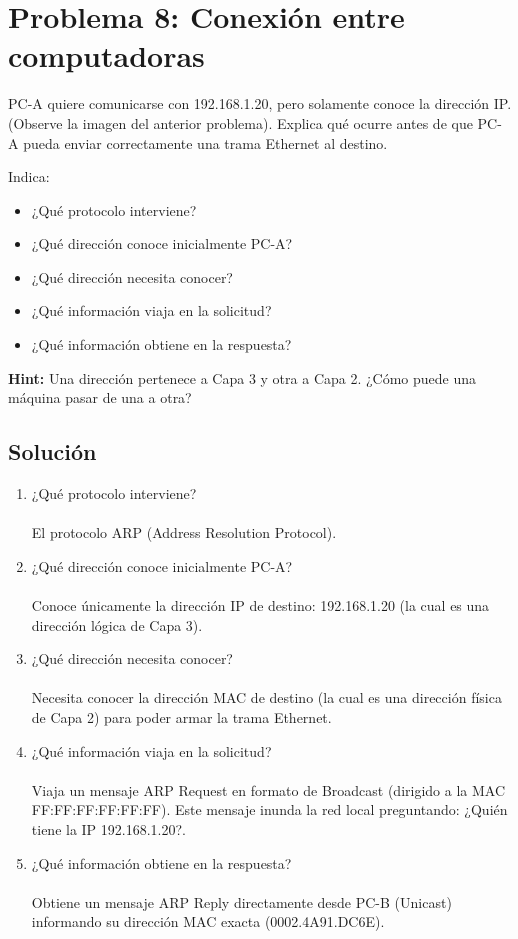 \section{Problema 8: Conexión entre computadoras}

\begin{tcolorbox}[enunciado]
PC-A quiere comunicarse con 192.168.1.20, pero solamente conoce la dirección IP. (Observe la imagen del anterior problema). Explica qué ocurre antes de que PC-A pueda enviar correctamente una trama Ethernet al destino.

Indica:
\begin{itemize}[leftmargin=*]
    \item ¿Qué protocolo interviene?
    \item ¿Qué dirección conoce inicialmente PC-A?
    \item ¿Qué dirección necesita conocer?
    \item ¿Qué información viaja en la solicitud?
    \item ¿Qué información obtiene en la respuesta?
\end{itemize}
\textbf{Hint:} Una dirección pertenece a Capa 3 y otra a Capa 2. ¿Cómo puede una máquina pasar de una a otra?
\end{tcolorbox}

\subsection*{Solución}

\begin{enumerate}[label=\arabic*., leftmargin=*]
    \item ¿Qué protocolo interviene?\\\\
    El protocolo ARP (Address Resolution Protocol).
    \item ¿Qué dirección conoce inicialmente PC-A?\\\\
    Conoce únicamente la dirección IP de destino: 192.168.1.20 (la cual es una dirección lógica de Capa 3).
    \item ¿Qué dirección necesita conocer?\\\\
    Necesita conocer la dirección MAC de destino (la cual es una dirección física de Capa 2) para poder armar la trama Ethernet.
    \item ¿Qué información viaja en la solicitud?\\\\
    Viaja un mensaje ARP Request en formato de Broadcast (dirigido a la MAC FF:FF:FF:FF:FF:FF). 
    Este mensaje inunda la red local preguntando: ¿Quién tiene la IP 192.168.1.20?.
    \item ¿Qué información obtiene en la respuesta?\\\\
    Obtiene un mensaje ARP Reply directamente desde PC-B (Unicast) informando su dirección MAC exacta (0002.4A91.DC6E).
\end{enumerate}